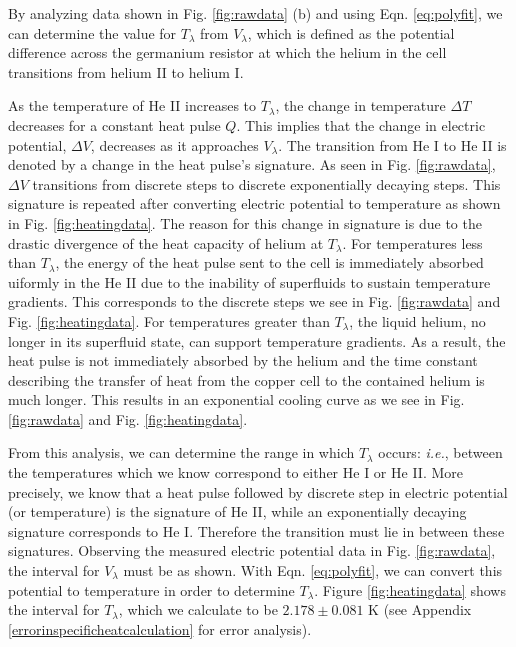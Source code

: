 By analyzing data shown in Fig. \ref{fig:rawdata} (b) and using Eqn. \ref{eq:polyfit}, we can determine the value for $T_{\lambda}$ from $V_{\lambda}$, which is defined as the potential difference across the germanium resistor at which the helium in the cell transitions from helium II to helium I. 

As the temperature of He II increases to $T_{\lambda}$, the change in temperature $\Delta T$ decreases for a constant heat pulse $Q$.  This implies that the change in electric potential, $\Delta V$, decreases as it approaches $V_{\lambda}$.  The transition from He I to He II is denoted by a change in the heat pulse's signature.  As seen in Fig. \ref{fig:rawdata}, $\Delta V$ transitions from discrete steps to discrete exponentially decaying steps.  This signature is repeated after converting electric potential to temperature as shown in Fig. \ref{fig:heatingdata}.  The reason for this change in signature is due to the drastic divergence of the heat capacity of helium at $T_{\lambda}$.  For temperatures less than $T_{\lambda}$, the energy of the heat pulse sent to the cell is immediately absorbed uiformly in the He II due to the inability of superfluids to sustain temperature gradients.  This corresponds to the discrete steps we see in Fig. \ref{fig:rawdata} and Fig. \ref{fig:heatingdata}.  For temperatures greater than $T_{\lambda}$, the liquid helium, no longer in its superfluid state, can support temperature gradients.  As a result, the heat pulse is not immediately absorbed by the helium and the time constant describing the transfer of heat from the copper cell to the contained helium is much longer. This results in an exponential cooling curve as we see in Fig. \ref{fig:rawdata} and Fig. \ref{fig:heatingdata}.  

From this analysis, we can determine the range in which $T_{\lambda}$ occurs: \emph{i.e.}, between the temperatures which we know correspond to either He I or He II.  More precisely, we know that a heat pulse followed by discrete step in electric potential (or temperature) is the signature of He II, while an exponentially decaying signature corresponds to He I. Therefore the transition must lie in between these signatures.  Observing the measured electric potential data in Fig. \ref{fig:rawdata}, the interval for $V_{\lambda}$ must be as shown.  With Eqn. \ref{eq:polyfit}, we can convert this potential to temperature in order to determine $T_{\lambda}$.  Figure \ref{fig:heatingdata} shows the interval for $T_{\lambda}$, which we calculate to be $2.178\pm0.081$ K (see Appendix \ref{errorinspecificheatcalculation} for error analysis). 

